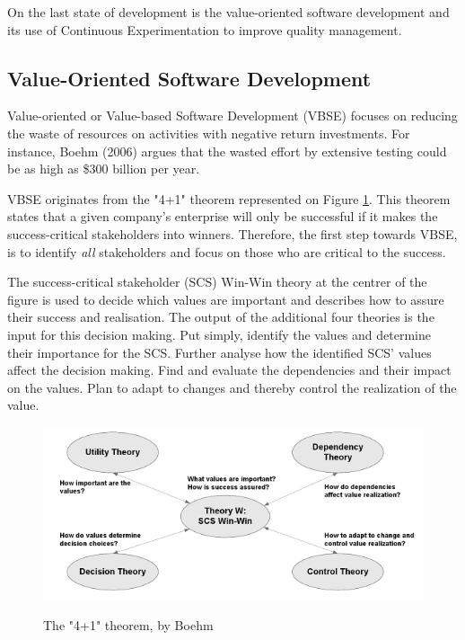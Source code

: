 \documentclass{sig-alternate}
\begin{document}
On the last state of development is the value-oriented software development and its use of Continuous Experimentation to improve quality management. 

\subsection{Value-Oriented Software Development}
\label{vosd}
Value-oriented or Value-based Software Development (VBSE) focuses on reducing the waste of resources on activities with negative return investments. For instance, Boehm (2006) argues that the wasted effort by extensive testing could be as high as \$300 billion per year\cite{stefan:valuebased}.

VBSE originates from the "4+1" theorem represented on Figure \ref{fig:fouronetheorem}. This theorem states that a given company's enterprise will only be successful if it makes the success-critical stakeholders into winners. Therefore, the first step towards VBSE, is to identify \textit{all} stakeholders and  focus on those who are critical to the success.

The success-critical stakeholder (SCS) Win-Win theory at the centrer of the figure is used to decide which values are important and describes how to assure their success and realisation. The output of the additional four theories is the input for this decision making. Put simply, identify the values and determine their importance for the SCS. Further analyse how the identified SCS' values affect the decision making. Find and evaluate the dependencies and their impact on the values. Plan to adapt to changes and thereby control the realization of the value.\cite{stefan:valuebased}

\begin{figure}
\caption{The "4+1" theorem, by Boehm}
\centering
\includegraphics[scale=0.6]{Umlet/4+1theorem}
\label{fig:fouronetheorem}
\end{figure} 
\end{document}
